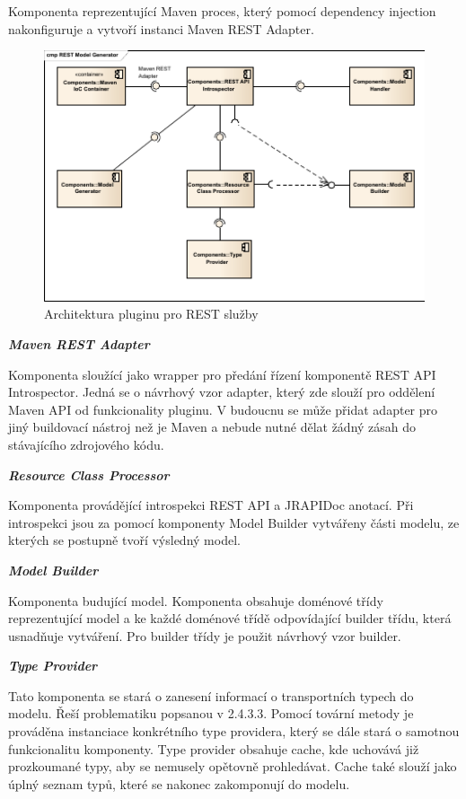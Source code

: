 \documentclass[11pt,twoside,a4paper]{book}
\begin{document}
Komponenta reprezentující Maven proces, který pomocí dependency injection nakonfiguruje
a vytvoří instanci Maven REST Adapter.

\begin{figure}[h]
\begin{center}
\includegraphics[width=13cm]{images-pdf/REST Model Generator.pdf}
\caption{Architektura pluginu pro REST služby}
\label{fig:logo}
\end{center}
\end{figure}

\textbf{\textit{Maven REST Adapter}}

Komponenta sloužící jako wrapper pro předání řízení komponentě REST API Introspector.
Jedná se o návrhový vzor adapter, který zde slouží pro oddělení Maven API od funkcionality
pluginu. V budoucnu se může přidat adapter pro jiný buildovací nástroj než je Maven a
nebude nutné dělat žádný zásah do stávajícího zdrojového kódu.

\textbf{\textit{Resource Class Processor}}

Komponenta provádějící introspekci REST API a JRAPIDoc anotací. Při introspekci jsou za
pomocí komponenty Model Builder vytvářeny části modelu, ze kterých se postupně tvoří
výsledný model.

\textbf{\textit{Model Builder}}

Komponenta budující model. Komponenta obsahuje doménové třídy reprezentující model a
ke každé doménové třídě odpovídající builder třídu, která usnadňuje vytváření. Pro builder
třídy je použit návrhový vzor builder.

\textbf{\textit{Type Provider}}

Tato komponenta se stará o zanesení informací o transportních typech do modelu. Řeší
problematiku popsanou v 2.4.3.3. Pomocí tovární metody je prováděna instanciace
konkrétního type providera, který se dále stará o samotnou funkcionalitu komponenty. Type
provider obsahuje cache, kde uchovává již prozkoumané typy, aby se nemusely opětovně
prohledávat. Cache také slouží jako úplný seznam typů, které se nakonec zakomponují do
modelu.
\end{document}
